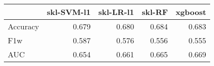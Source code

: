 \begin{tabular}{lrrrr}
\toprule
{} &  skl-SVM-l1 &  skl-LR-l1 &  skl-RF &  xgboost \\
\midrule
Accuracy &       0.679 &      0.680 &   0.684 &    0.683 \\
F1w      &       0.587 &      0.576 &   0.556 &    0.555 \\
AUC      &       0.654 &      0.661 &   0.665 &    0.669 \\
\bottomrule
\end{tabular}
